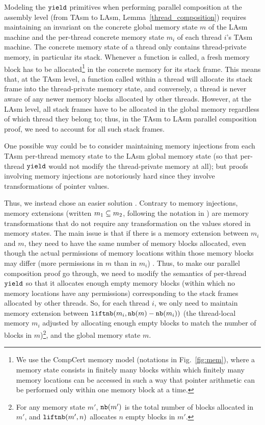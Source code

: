 Modeling the ${\texttt{yield}}$ primitives when performing parallel
composition at the assembly level (from TAsm to LAsm, Lemma~\ref{thread_composition}) requires
maintaining an invariant on the concrete global memory state $m$ of
the LAsm machine and the per-thread concrete memory state $m_i$ of
each thread $i$'s TAsm machine. The concrete memory state of a thread
only contains thread-private memory, in particular its stack. Whenever
a function is called, a fresh memory block has to be allocated\footnote{We use the CompCert memory model \cite{leroy08}(notations in Fig.~\ref{fig:mem}), where a memory state consists in finitely many blocks within which finitely many memory locations can be accessed in such a way that pointer arithmetic can be performed only within one memory block at a time.} in the
concrete memory for its stack frame. This means that, at the TAsm
level, a function called within a thread will allocate its stack frame
into the thread-private memory state, and conversely, a thread is
never aware of any newer memory blocks allocated by other
threads. However, at the LAsm level, all stack frames have to be allocated
in the global memory regardless of which thread they belong to;
thus, in the TAsm to LAsm parallel composition proof, we need to account
for all such stack frames.

One possible way could be to consider maintaining memory injections
from each TAsm per-thread memory state to the LAsm global memory state
(so that per-thread ${\texttt{yield}}$ would not modify the thread-private
memory at all); but proofs involving memory injections are notoriously
hard since they involve transformations of pointer values.

Thus, we instead chose an easier solution \cite[\S 5.2]{leroy08}. Contrary to memory injections,
memory extensions (written ${m_1} \subseteq {m_2}$, following the
notation in \cite[\S 5.2]{leroy08}) are memory transformations that do
not require any transformation on the values
stored in memory states. The main issue is that if there is a memory
extension between $m_i$ and $m$, they need to have the same number of
memory blocks allocated, even though the actual permissions of memory
locations within those memory blocks may differ (more permissions in
$m$ than in $m_i$) \cite{compcert-mem-v2}. Thus, to make our parallel composition proof go
through, we need to modify the semantics of per-thread ${\texttt{yield}}$ so
that it allocates enough empty memory blocks (within which no memory
locations have any permissions) corresponding to the stack frames
allocated by other threads. So, for each thread $i$, we only need to
maintain memory extension between ${\texttt{liftnb}}({m_i}, {{\texttt{nb}}({m}) -
{\texttt{nb}}({m_i})})$ (the thread-local memory $m_i$ adjusted by
allocating enough empty blocks to match the number of blocks in $m$)\footnote{For any memory state $m'$,
${\texttt{nb}}({m'})$ is the total number of blocks allocated in $m'$, and
${\texttt{liftnb}}({m'}, {n})$ allocates $n$ empty blocks in $m'$.},
and the global memory state $m$.

